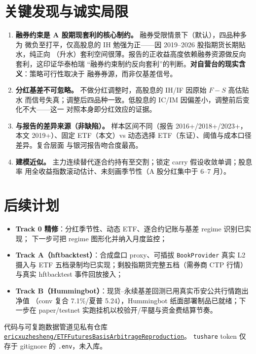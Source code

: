 \documentclass[11pt]{ctexart}
\newcommand{\pct}[1]{#1\%}
\begin{document}
\section{关键发现与诚实局限}

\begin{enumerate}\setlength\itemsep{2pt}
  \item \textbf{融券约束是 A 股期现套利的核心制约。} 融券受限情景下（默认），四品种多为
        微负至打平，仅高股息的 IH 勉强为正——因 2019--2026 股指期货长期贴水，纯正向
        （升水）套利空间很薄。报告的正收益高度依赖融券资源做反向套利，这印证华泰柏瑞
        ``融券约束制约反向套利''的判断。\textbf{对自营台的现实含义}：策略可行性取决于
        融券券源，而非仅基差信号。
  \item \textbf{分红基差不可忽略。} 不做分红调整时，高股息的 IH/IF 因原始 $F-S$ 高估贴水
        而信号失真；调整后四品种一致。低股息的 IC/IM 因偏差小，调整前后变化不大——这一
        对照本身即分红效应的证据。
  \item \textbf{与报告的差异来源（非缺陷）。} 样本区间不同（报告 2016+/2018+/2023+，本文
        2019+）、固定 ETF（本文）vs 动态选择 ETF（东证）、阈值与成本口径差异。复合层面
        与银河报告吻合度最高。
  \item \textbf{建模近似。} 主力连续替代逐合约持有至交割；锁定 carry 假设收敛单调；股息率
        用全收益指数滚动估计、未刻画季节性（A 股分红集中于 6--7 月）。
\end{enumerate}

\section{后续计划}
\begin{itemize}\setlength\itemsep{1pt}
  \item \textbf{Track 0 精修}：分红季节性、动态 ETF、逐合约记账与基差 regime 识别已实现；
        下一步可把 regime 图形化并纳入月度监控；
  \item \textbf{Track A（hftbacktest）}：合成盘口 proxy、可插拔 \texttt{BookProvider} 真实
        L2 摄入与 ETF 五档录制均已实现；剩股指期货完整五档（需券商 CTP 行情）与真实
        hftbacktest 事件回放接入；
  \item \textbf{Track B（Hummingbot）}：现货--永续基差回测已用真实币安公共行情跑出净值
        （conv 复合 \pct{7.1}/夏普 5.24），Hummingbot 纸面部署制品已就绪；下一步在
        paper/testnet 实跑挂机以校验开/平腿与资金费结算节奏。
\end{itemize}

\vspace{4pt}
{\sloppy
\noindent\footnotesize 代码与可复跑数据管道见私有仓库
\href{https://github.com/ericxuzhesheng/ETF-Futures-Basis-Arbitrage-Reproduction}%
{\texttt{ericxuzhesheng/\allowbreak ETF\-Futures\-Basis\-Arbitrage\-Reproduction}}。
\texttt{tushare} token 仅存于 gitignore 的 \texttt{.env}，未入库。
\par}
\end{document}
